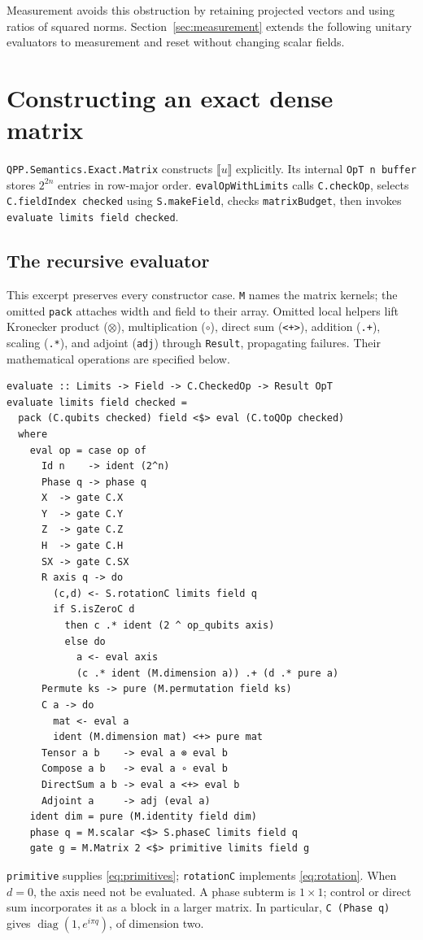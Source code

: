 \documentclass[11pt,a4paper]{article}
\newcommand{\sem}[1]{\llbracket #1\rrbracket}
\newcommand{\code}[1]{\texttt{#1}}
\DeclareMathOperator{\diag}{diag}
\begin{document}
Measurement avoids this obstruction by retaining projected vectors and using
ratios of squared norms. Section~\ref{sec:measurement} extends the following
unitary evaluators to measurement and reset without changing scalar fields.

\section{Constructing an exact dense matrix}
\label{sec:dense}
\code{QPP.Semantics.Exact.Matrix} constructs $\sem u$ explicitly.
Its internal \code{OpT n buffer} stores $2^{2n}$ entries in row-major order.
\code{evalOpWithLimits} calls \code{C.checkOp}, selects \code{C.fieldIndex checked}
using \code{S.makeField}, checks \code{matrixBudget}, then invokes
\code{evaluate limits field checked}.

\subsection{The recursive evaluator}
This excerpt preserves every constructor case. \code{M} names the matrix
kernels; the omitted \code{pack} attaches width and field to their array.
Omitted local helpers lift Kronecker product ($\otimes$), multiplication
($\circ$), direct sum (\code{<+>}), addition (\code{.+}), scaling (\code{.*}),
and adjoint (\code{adj}) through \code{Result}, propagating failures.
Their mathematical operations are specified below.
\begin{lstlisting}[label=lst:matrix-evaluate]
evaluate :: Limits -> Field -> C.CheckedOp -> Result OpT
evaluate limits field checked =
  pack (C.qubits checked) field <$> eval (C.toQOp checked)
  where
    eval op = case op of
      Id n    -> ident (2^n)
      Phase q -> phase q
      X  -> gate C.X
      Y  -> gate C.Y
      Z  -> gate C.Z
      H  -> gate C.H
      SX -> gate C.SX
      R axis q -> do
        (c,d) <- S.rotationC limits field q
        if S.isZeroC d
          then c .* ident (2 ^ op_qubits axis)
          else do
            a <- eval axis
            (c .* ident (M.dimension a)) .+ (d .* pure a)
      Permute ks -> pure (M.permutation field ks)
      C a -> do
        mat <- eval a
        ident (M.dimension mat) <+> pure mat
      Tensor a b    -> eval a ⊗ eval b
      Compose a b   -> eval a ∘ eval b
      DirectSum a b -> eval a <+> eval b
      Adjoint a     -> adj (eval a)
    ident dim = pure (M.identity field dim)
    phase q = M.scalar <$> S.phaseC limits field q
    gate g = M.Matrix 2 <$> primitive limits field g
\end{lstlisting}
\code{primitive} supplies \eqref{eq:primitives}; \code{rotationC} implements
\eqref{eq:rotation}. When $d=0$, the axis
need not be evaluated. A phase subterm is $1\times1$; control or direct
sum incorporates it as a block in a larger matrix. In particular,
\code{C (Phase q)} gives $\diag(1,e^{i\pi q})$, of dimension two.
\end{document}

